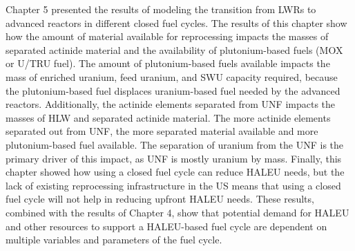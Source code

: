 Chapter 5 presented the results of modeling the transition from 
\glspl{LWR} to advanced reactors in different closed fuel cycles. 
The results of this chapter show how the amount of material 
available for reprocessing impacts the masses of separated 
actinide material and the availability of plutonium-based 
fuels (\gls{MOX} or U/TRU fuel). The amount of plutonium-based 
fuels available impacts the 
mass of enriched uranium, feed uranium, and \gls{SWU} 
capacity required, because the plutonium-based fuel displaces 
uranium-based fuel needed by the advanced reactors. Additionally,
the actinide elements 
separated from \gls{UNF} impacts the masses of \gls{HLW} and separated 
actinide material. The more actinide elements separated out from 
\gls{UNF}, the more separated material available and more 
plutonium-based fuel available. The separation of uranium from the 
\gls{UNF} is the primary driver of this impact, as 
\gls{UNF} is mostly uranium by mass. Finally, this chapter 
showed how using a closed fuel cycle can reduce \gls{HALEU} 
needs, but the lack of existing reprocessing infrastructure 
in the US means that using a closed fuel cycle will not help 
in reducing upfront \gls{HALEU} needs. 
These results, combined 
with the results of Chapter 4, show that potential demand for 
\gls{HALEU} and other resources to support a \gls{HALEU}-based 
fuel cycle are dependent on multiple variables and parameters 
of the fuel cycle. 

